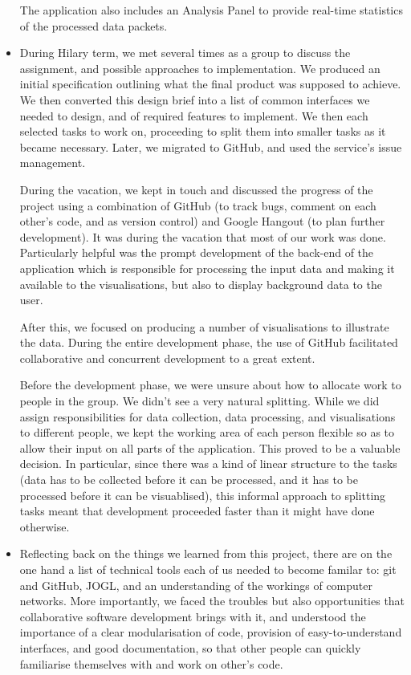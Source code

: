 \documentclass[12pt,a4paper]{article}
\begin{document}
\begin{itemize}
			The application also includes an Analysis Panel to provide real-time statistics of the processed data packets.
		\item During Hilary term, we met several times as a group to discuss the assignment, and possible approaches to implementation. We produced an initial specification outlining what the final product was supposed to achieve. We then converted this design brief into a list of common interfaces we needed to design, and of required features to implement. We then each selected tasks to work on, proceeding to split them into smaller tasks as it became necessary. Later, we migrated to GitHub, and used the service's issue management.
		
		During the vacation, we kept in touch and discussed the progress of the project using a combination of GitHub (to track bugs, comment on each other's code, and as version control) and Google Hangout (to plan further development). It was during the vacation that most of our work was done. Particularly helpful was the prompt development of the back-end of the application which is responsible for processing the input data and making it available to the visualisations, but also to display background data to the user.
		
		After this, we focused on producing a number of visualisations to illustrate the data. During the entire development phase, the use of GitHub facilitated collaborative and concurrent development to a great extent.
		
		Before the development phase, we were unsure about how to allocate work to people in the group. We didn't see a very natural splitting. While we did assign responsibilities for data collection, data processing, and visualisations to different people, we kept the working area of each person flexible so as to allow their input on all parts of the application. This proved to be a valuable decision. In particular, since there was a kind of linear structure to the tasks (data has to be collected before it can be processed, and it has to be processed before it can be visuablised), this informal approach to splitting tasks meant that development proceeded faster than it might have done otherwise.
		\item Reflecting back on the things we learned from this project, there are on the one hand a list of technical tools each of us needed to become familar to: git and GitHub, JOGL, and an understanding of the workings of computer networks. More importantly, we faced the troubles but also opportunities that collaborative software development brings with it, and understood the importance of a clear modularisation of code, provision of easy-to-understand interfaces, and good documentation, so that other people can quickly familiarise themselves with and work on other's code. 
		

\end{itemize}
\end{document}
